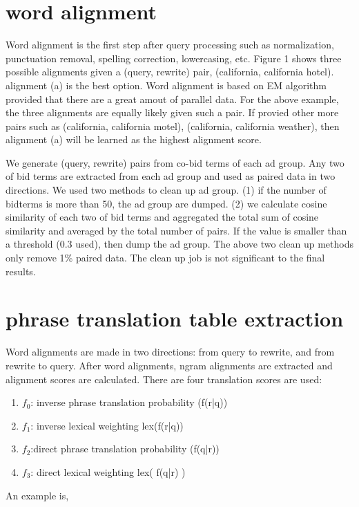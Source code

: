 \documentclass{sig-alternate}
\begin{document}
\section{word alignment}
Word alignment is the first step after query processing such as normalization, punctuation removal, spelling correction, lowercasing, etc. Figure 1 shows three possible alignments given a (query, rewrite) pair, (california, california hotel).  alignment (a) is the best option. Word alignment is based on EM algorithm provided that there are a great amout of parallel data. For the above example, the three alignments are equally likely given such a pair. If provied other more pairs such as (california, california motel), (california, california weather), then alignment (a) will be learned as the highest alignment score. 

We generate (query, rewrite) pairs from co-bid terms of each ad group. Any two of bid terms are extracted from each ad group and used as paired data in two directions. We used two methods to clean up ad group. (1) if the number of bidterms is more than 50, the ad group are dumped. (2) we calculate cosine similarity of each two of bid terms and aggregated the total sum of cosine similarity and averaged by the total number of pairs. If the value is smaller than a threshold (0.3 used), then dump the ad group. The above two clean up methods only remove 1\% paired data. The clean up job is not significant to the final results.

\section{phrase translation table extraction}
Word alignments are made in two directions: from query to rewrite, and from rewrite to query. After word alignments, ngram alignments are extracted and alignment scores are calculated. There are four translation scores are used:

\begin{enumerate}
\item $f_{0}$: inverse phrase translation probability (f(r|q))
\item $f_{1}$: inverse lexical weighting lex(f(r|q))
\item $f_{2}$:direct phrase translation probability (f(q|r))
\item $f_{3}$: direct lexical weighting lex( f(q|r) )
\end{enumerate}

 An example is,
\end{document}
